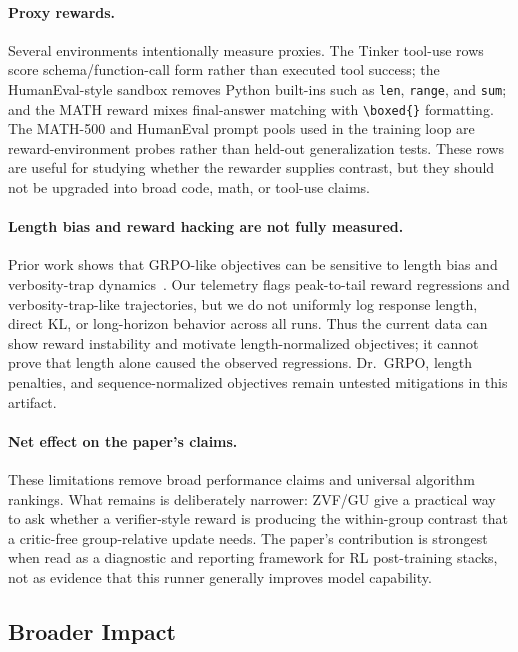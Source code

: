 \paragraph{Proxy rewards.}
Several environments intentionally measure proxies.  The Tinker tool-use rows
score schema/function-call form rather than executed tool success; the
HumanEval-style sandbox removes Python built-ins such as \texttt{len},
\texttt{range}, and \texttt{sum}; and the MATH reward mixes final-answer matching
with \texttt{\textbackslash boxed\{\}} formatting.  The MATH-500 and HumanEval
prompt pools used in the training loop are reward-environment probes rather
than held-out generalization tests.  These rows are useful for studying whether
the rewarder supplies contrast, but they should not be upgraded into broad code,
math, or tool-use claims.

\paragraph{Length bias and reward hacking are not fully measured.}
Prior work shows that GRPO-like objectives can be sensitive to length bias and
verbosity-trap dynamics~\citep{liu2025grpo_dpo,wang2025madgrpo}.  Our telemetry
flags peak-to-tail reward regressions and verbosity-trap-like trajectories, but
we do not uniformly log response length, direct KL, or long-horizon behavior
across all runs.  Thus the current data can show reward instability and motivate
length-normalized objectives; it cannot prove that length alone caused the
observed regressions.  Dr.~GRPO, length penalties, and sequence-normalized
objectives remain untested mitigations in this artifact.

\paragraph{Net effect on the paper's claims.}
These limitations remove broad performance claims and universal algorithm
rankings.  What remains is deliberately narrower: ZVF/GU give a practical way to
ask whether a verifier-style reward is producing the within-group contrast that
a critic-free group-relative update needs.  The paper's contribution is strongest
when read as a diagnostic and reporting framework for RL post-training
stacks, not as evidence that this runner generally improves model capability.

\subsection{Broader Impact}
\label{sec:impact}

